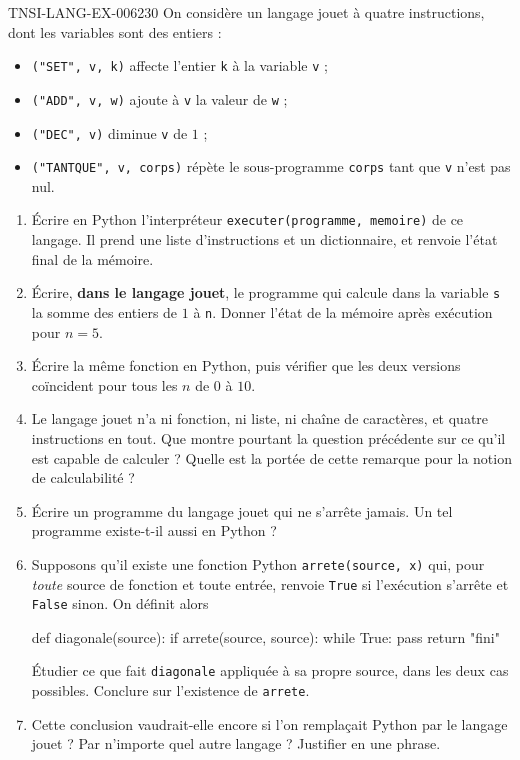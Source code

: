 \begin{exercice}{TNSI-LANG-EX-006}{2}{30}
On considère un langage jouet à quatre instructions, dont les variables sont des
entiers :
\begin{itemize}
  \item \lstinline{("SET", v, k)} affecte l'entier \lstinline{k} à la variable
    \lstinline{v} ;
  \item \lstinline{("ADD", v, w)} ajoute à \lstinline{v} la valeur de
    \lstinline{w} ;
  \item \lstinline{("DEC", v)} diminue \lstinline{v} de $1$ ;
  \item \lstinline{("TANTQUE", v, corps)} répète le sous-programme
    \lstinline{corps} tant que \lstinline{v} n'est pas nul.
\end{itemize}
\begin{enumerate}
  \item Écrire en Python l'interpréteur \lstinline{executer(programme, memoire)}
    de ce langage. Il prend une liste d'instructions et un dictionnaire, et
    renvoie l'état final de la mémoire.
  \item Écrire, \textbf{dans le langage jouet}, le programme qui calcule dans la
    variable \lstinline{s} la somme des entiers de $1$ à \lstinline{n}. Donner
    l'état de la mémoire après exécution pour $n=5$.
  \item Écrire la même fonction en Python, puis vérifier que les deux versions
    coïncident pour tous les $n$ de $0$ à $10$.
  \item Le langage jouet n'a ni fonction, ni liste, ni chaîne de caractères, et
    quatre instructions en tout. Que montre pourtant la question précédente sur
    ce qu'il est capable de calculer ? Quelle est la portée de cette remarque
    pour la notion de calculabilité ?
  \item Écrire un programme du langage jouet qui ne s'arrête jamais. Un tel
    programme existe-t-il aussi en Python ?
  \item Supposons qu'il existe une fonction Python \lstinline{arrete(source, x)}
    qui, pour \emph{toute} source de fonction et toute entrée, renvoie
    \lstinline{True} si l'exécution s'arrête et \lstinline{False} sinon. On
    définit alors
    \begin{python}
def diagonale(source):
    if arrete(source, source):
        while True:
            pass
    return "fini"
    \end{python}
    Étudier ce que fait \lstinline{diagonale} appliquée à sa propre source, dans
    les deux cas possibles. Conclure sur l'existence de \lstinline{arrete}.
  \item Cette conclusion vaudrait-elle encore si l'on remplaçait Python par le
    langage jouet ? Par n'importe quel autre langage ? Justifier en une phrase.
\end{enumerate}
\end{exercice}
